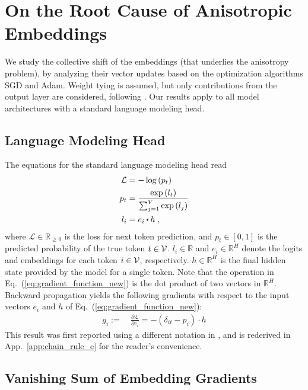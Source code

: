 \section{On the Root Cause of Anisotropic Embeddings}%
\label{sec:theory}

We study the collective shift of the embeddings (that underlies the anisotropy problem), by analyzing their vector updates based on the optimization algorithms SGD and Adam. Weight tying is assumed, but only contributions from the output layer are considered, following \citet{bis2021tmic}. 
Our results apply to all model architectures with a standard language modeling head.

\subsection{Language Modeling Head}

The equations for the standard language modeling head read
\begin{align}
\mathcal{L} &= - \log{(p_t)} \label{eq:forward_loss} \\
    p_t &= \frac{\exp{(l_t)}}{\sum_{j=1}^V \exp{(l_j)}} \label{eq:forward_probability}\\ %
l_i &= e_i \bigcdot h \label{eq:gradient_function_new} \; ,
\end{align}
where $\mathcal{L} \in \mathbb{R}_{\geq 0}$ is the loss for next token prediction, and $p_t \in [0, 1]$ is the predicted probability of the true token $t \in \mathcal{V}$. $l_i \in \mathbb{R}$ and $e_i \in \mathbb{R}^H$ denote the logits and embeddings for each token $i \in \mathcal{V}$, respectively. $h \in \mathbb{R}^H$ is the final hidden state provided by the model for a single token. Note that the operation in Eq.~(\ref{eq:gradient_function_new}) is the dot product of two vectors in $\mathbb{R}^H$.
Backward propagation yields the following gradients with respect to the input vectors $e_i$ and $h$ of Eq.~(\ref{eq:gradient_function_new}):
\begin{align}
g_i :=~ &\frac{\partial \mathcal{L}}{\partial e_i} 
= - \left( \delta_{it} - p_i \right) \cdot h \label{eq:chain_rule_e} 
\end{align}
This result was first reported using a different notation in \citet{bis2021tmic}, and is rederived in App.~\ref{app:chain_rule_e} for the reader's convenience.

\subsection{Vanishing Sum of Embedding Gradients}

